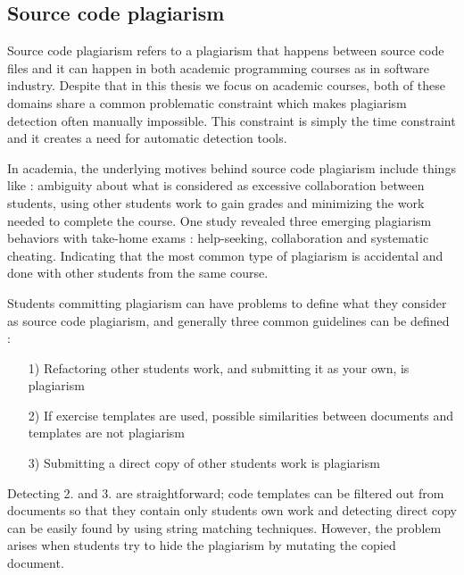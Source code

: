 \subsection{Source code plagiarism} \label{chap-bg-sc-plag}

Source code plagiarism refers to a plagiarism that happens between source code files and it can happen in both academic programming courses as in software industry. Despite that in this thesis we focus on academic courses, both of these domains share a common problematic constraint which makes plagiarism detection often manually impossible. This constraint is simply the time constraint and it creates a need for automatic detection tools. 

In academia, the underlying motives behind source code plagiarism include things like \cite{PlagInProg1999}: ambiguity about what is considered as excessive collaboration between students, using other students work to gain grades and minimizing the work needed to complete the course. One study revealed three emerging plagiarism behaviors with take-home exams \cite{Hellas:2017:PTE:3059009.3059065}: help-seeking, collaboration and systematic cheating. Indicating that the most common type of plagiarism is accidental and done with other students from the same course.

Students committing plagiarism can have problems to define what they consider as source code plagiarism, and generally three common guidelines can be defined \cite{Pieterse2014DecodingCP}:

\begin{enumerate}
    \item[1)] Refactoring other students work, and submitting it as your own, is plagiarism
    \item[2)] If exercise templates are used, possible similarities between documents and templates are not plagiarism
    \item[3)] Submitting a direct copy of other students work is plagiarism
\end{enumerate}

\noindent
Detecting 2. and 3. are straightforward; code templates can be filtered out from documents so that they contain only students own work and detecting direct copy can be easily found by using string matching techniques. However, the problem arises when students try to hide the plagiarism by mutating the copied document.

